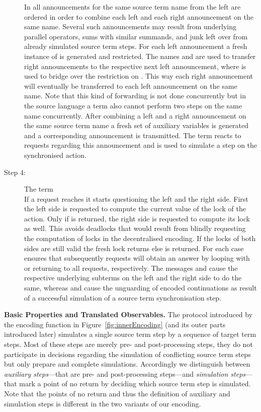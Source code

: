 \documentclass[copyright,creativecommons]{eptcs}
\begin{document}
\begin{description}
		In  all announcements for the same source term name  from the left are ordered in order to combine each left and each right announcement on the same name. Several such announcements may result from underlying parallel operators, sums with similar summands, and junk left over from already simulated source term steps. For each left announcement a fresh instance of  is generated and restricted. The names  and  are used to transfer right announcements to the respective next left announcement, where  is used to bridge over the restriction on . This way each right announcement will eventually be transferred to each left announcement on the same name. Note that this kind of forwarding is not done concurrently but in the source language a term  also cannot perform two steps on the same name  concurrently. After combining a left and a right announcement on the same source term name a fresh set of auxiliary variables  is generated and a corresponding announcement is transmitted. The term  reacts to requests regarding this announcement and is used to simulate a step on the synchronised action.
	\item[Step 4:] The term \\
		If a request reaches  it starts questioning the left and the right side. First the left side is requested to compute the current value of the lock of the action. Only if  is returned, the right side is requested to compute its lock as well. This avoids deadlocks that would result from blindly requesting the computation of locks in the decentralised encoding. If the locks of both sides are still valid the fresh lock  returns  else  is returned. For each case  ensures that subsequently requests will obtain an answer by looping with  or returning  to all requests, respectively. The messages  and  cause the respective underlying subterms on the left and the right side to do the same, whereas  and  cause the unguarding of encoded continuations as result of a successful simulation of a source term synchronisation step.
\end{description}

\vspace{0.3em}
\noindent
\textbf{Basic Properties and Translated Observables.}\;
The protocol introduced by the encoding function in Figure~\ref{fig:innerEncoding} (and its outer parts introduced later) simulates a single source term step by a sequence of target term steps. Most of these steps are merely pre- and post-processing steps, \ie they do not participate in decisions regarding the simulation of conflicting source term steps but only prepare and complete simulations. Accordingly we distinguish between \emph{auxiliary steps}---that are pre- and post-processing steps---and \emph{simulation steps}---that mark a point of no return by deciding which source term step is simulated. Note that the points of no return and thus the definition of auxiliary and simulation steps is different in the two variants of our encoding.
\end{document}
